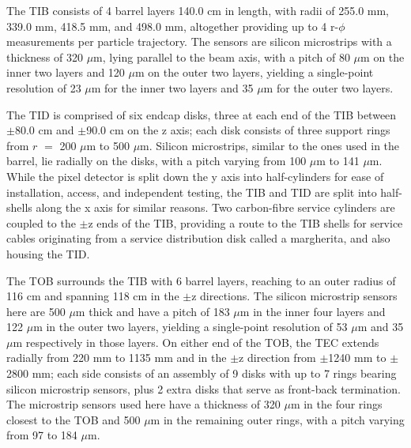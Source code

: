 The TIB consists of 4 barrel layers 140.0 cm in length, with radii of 255.0 mm, 339.0 mm, 418.5 mm, and 498.0 mm, altogether providing up to 4 r-$\phi$ measurements per particle trajectory. The sensors are silicon microstrips with a thickness of 320 $\mu$m, lying parallel to the beam axis, with a pitch of 80 $\mu$m on the inner two layers and 120 $\mu$m on the outer two layers, yielding a single-point resolution of 23 $\mu$m for the inner two layers and 35 $\mu$m for the outer two layers.

The TID is comprised of six endcap disks, three at each end of the TIB between $\pm$80.0 cm and $\pm$90.0 cm on the z axis; each disk consists of three support rings from $r$ $=$ 200 $\mu$m to 500 $\mu$m. Silicon microstrips, similar to the ones used in the barrel, lie radially on the disks, with a pitch varying from 100 $\mu$m to 141 $\mu$m. While the pixel detector is split down the y axis into half-cylinders for ease of installation, access, and independent testing, the TIB and TID are split into half-shells along the x axis for similar reasons. Two carbon-fibre service cylinders are coupled to the $\pm$z ends of the TIB, providing a route to the TIB shells for service cables originating from a service distribution disk called a margherita, and also housing the TID.

The TOB surrounds the TIB with 6 barrel layers, reaching to an outer radius of 116 cm and spanning 118 cm in the $\pm$z directions. The silicon microstrip sensors here are 500 $\mu$m thick and have a pitch of 183 $\mu$m in the inner four layers and 122 $\mu$m in the outer two layers, yielding a single-point resolution of 53 $\mu$m and 35 $\mu$m respectively in those layers. On either end of the TOB, the TEC extends radially from 220 mm to 1135 mm and in the $\pm$z direction from $\pm$1240 mm to $\pm$2800 mm; each side consists of an assembly of 9 disks with up to 7 rings bearing silicon microstrip sensors, plus 2 extra disks that serve as front-back termination. The microstrip sensors used here have a thickness of 320 $\mu$m in the four rings closest to the TOB and 500 $\mu$m in the remaining outer rings, with a pitch varying from 97 to 184 $\mu$m.

